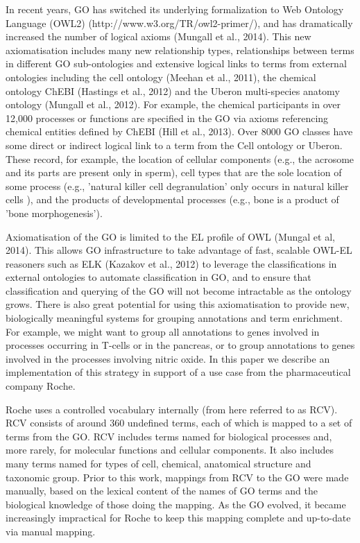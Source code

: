 \documentclass[runningheads,a4paper]{llncs}
\begin{document}
{In recent years, GO has switched its underlying formalization to Web Ontology Language (OWL2) (http://www.w3.org/TR/owl2-primer/), and has dramatically increased the number of logical axioms (Mungall et al., 2014). This new axiomatisation includes many new relationship types, relationships between terms in different GO sub-ontologies and extensive logical links to terms from external ontologies including the cell ontology (Meehan et al., 2011), the chemical ontology ChEBI (Hastings et al., 2012) and the Uberon multi-species anatomy ontology (Mungall et al., 2012).  For example, the chemical participants in over 12,000 processes or functions are specified in the GO via axioms referencing chemical entities defined by ChEBI (Hill et al., 2013). Over 8000 GO classes have some direct or indirect logical link to a term from the Cell ontology or Uberon. These record, for example, the location of cellular components (e.g., the acrosome and its parts are present only in sperm), cell types that are the sole location of some process (e.g., 'natural killer cell degranulation' only occurs in natural killer cells ), and the products of developmental processes (e.g., bone is a product of 'bone morphogenesis').

Axiomatisation of the GO is limited to the EL profile of OWL (Mungal et al, 2014). This allows GO infrastructure to take advantage of fast, scalable OWL-EL reasoners such as ELK (Kazakov et al., 2012) to leverage the classifications in external ontologies to automate classification in GO, and to ensure that classification and querying of the GO will not become intractable as the ontology grows.  There is also great potential for using this axiomatisation to provide new, biologically meaningful systems for grouping annotations and term enrichment.  For example, we might want to group all annotations to genes involved in processes occurring in T-cells or in the pancreas, or to group annotations to genes involved in the processes involving nitric oxide.  In this paper we describe an implementation of this strategy in support of a use case from the pharmaceutical company Roche.

Roche uses a controlled vocabulary internally (from here referred to as RCV).  RCV consists of around 360 undefined terms, each of which is mapped to a set of terms from the GO. RCV includes terms named for biological processes and, more rarely, for molecular functions and cellular components.  It also includes many terms named for types of cell, chemical, anatomical structure and taxonomic group. Prior to this work, mappings from RCV to the GO were made manually, based on the lexical content of the names of GO terms and the biological knowledge of those doing the mapping.  As the GO evolved, it became increasingly impractical for Roche to keep this mapping complete and up-to-date via manual mapping.

}
\end{document}
